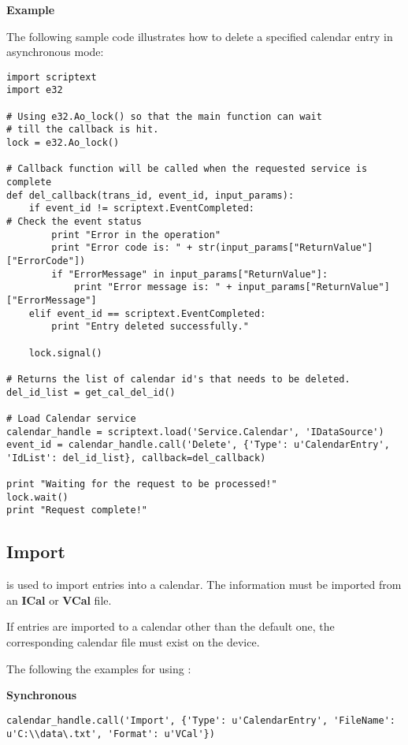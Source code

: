 {\bf Example} \break

The following sample code illustrates how to delete a specified calendar entry in asynchronous mode:

\begin{verbatim}
import scriptext
import e32

# Using e32.Ao_lock() so that the main function can wait 
# till the callback is hit.
lock = e32.Ao_lock()

# Callback function will be called when the requested service is complete
def del_callback(trans_id, event_id, input_params):
    if event_id != scriptext.EventCompleted:   
# Check the event status
        print "Error in the operation"
        print "Error code is: " + str(input_params["ReturnValue"]["ErrorCode"])
        if "ErrorMessage" in input_params["ReturnValue"]:
            print "Error message is: " + input_params["ReturnValue"]["ErrorMessage"]
    elif event_id == scriptext.EventCompleted:
        print "Entry deleted successfully."

    lock.signal()

# Returns the list of calendar id's that needs to be deleted.
del_id_list = get_cal_del_id()

# Load Calendar service
calendar_handle = scriptext.load('Service.Calendar', 'IDataSource')
event_id = calendar_handle.call('Delete', {'Type': u'CalendarEntry', 'IdList': del_id_list}, callback=del_callback)

print "Waiting for the request to be processed!"
lock.wait()
print "Request complete!"
\end{verbatim}

\subsection{Import}
\label{subsec:calendarimport}

 is used to import entries into a calendar. The information must be imported from an {\bf ICal} or {\bf VCal} file.

\begin{notice}[note]
If entries are imported to a calendar other than the default one, the corresponding calendar file must exist on the device.
\end{notice}

The following the examples for using :

{\bf Synchronous} \break

\begin{verbatim}
calendar_handle.call('Import', {'Type': u'CalendarEntry', 'FileName': u'C:\\data\.txt', 'Format': u'VCal'})
\end{verbatim}


